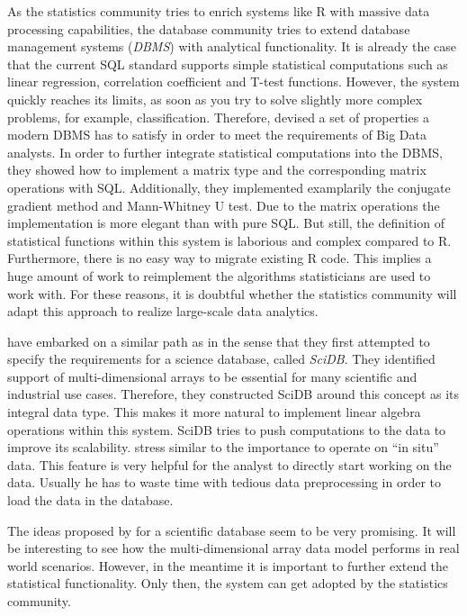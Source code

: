 As the statistics community tries to enrich systems like R with massive data processing capabilities, the database community tries to extend database management systems (\emph{DBMS}) with analytical functionality.
It is already the case that the current SQL standard supports simple statistical computations such as linear regression, correlation coefficient and T-test functions.
However, the system quickly reaches its limits, as soon as you try to solve slightly more complex problems, for example, classification.
Therefore, \textcite{cohen:pve2009a} devised a set of properties a modern DBMS has to satisfy in order to meet the requirements of Big Data analysts.
In order to further integrate statistical computations into the DBMS, they showed how to implement a matrix type and the corresponding matrix operations with SQL.
Additionally, they implemented examplarily the conjugate gradient method and Mann-Whitney U test.
Due to the matrix operations the implementation is more elegant than with pure SQL.
But still, the definition of statistical functions within this system is laborious and complex compared to R.
Furthermore, there is no easy way to migrate existing R code.
This implies a huge amount of work to reimplement the algorithms statisticians are used to work with.
For these reasons, it is doubtful whether the statistics community will adapt this approach to realize large-scale data analytics.

\Textcite{stonebraker:2009a} have embarked on a similar path as \citeauthor{cohen:pve2009a} in the sense that they first attempted to specify the requirements for a science database, called \emph{SciDB}.
They identified support of multi-dimensional arrays to be essential for many scientific and industrial use cases.
Therefore, they constructed SciDB around this concept as its integral data type.
This makes it more natural to implement linear algebra operations within this system.
SciDB tries to push computations to the data to improve its scalability.
\citeauthor{stonebraker:2009a} stress similar to \citeauthor{cohen:pve2009a} the importance to operate on ``in situ'' data.
This feature is very helpful for the analyst to directly start working on the data.
Usually he has to waste time with tedious data preprocessing in order to load the data in the database.

The ideas proposed by \citeauthor{stonebraker:2009a} for a scientific database seem to be very promising.
It will be interesting to see how the multi-dimensional array data model performs in real world scenarios.
However, in the meantime it is important to further extend the statistical functionality.
Only then, the system can get adopted by the statistics community.

